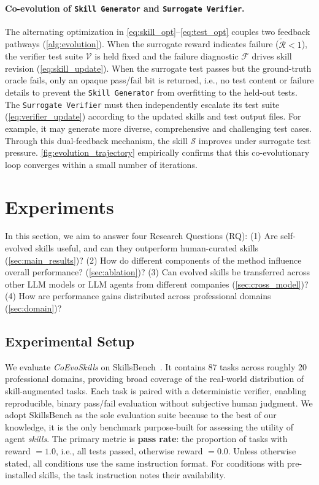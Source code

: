 \documentclass{article}
\newcommand{\method}{\textit{CoEvoSkills}\xspace}
\newcommand{\bench}{SkillsBench\xspace}
\newcommand{\skill}{\mathcal{S}}
\begin{document}
\paragraph{Co-evolution of \texttt{Skill Generator} and \texttt{Surrogate Verifier}.}
The alternating optimization in \autoref{eq:skill_opt}--\autoref{eq:test_opt} couples two feedback pathways (\autoref{alg:evolution}). When the surrogate reward indicates failure ($\tilde{\mathcal{R}} < 1$), the verifier test suite $\mathcal{V}$ is held fixed and the failure diagnostic $\mathcal{F}$ drives skill revision (\autoref{eq:skill_update}). When the surrogate test passes but the ground-truth oracle fails, only an opaque pass/fail bit is returned, i.e., no test content or failure details to prevent the \texttt{Skill Generator} from overfitting to the held-out tests. The \texttt{Surrogate Verifier} must then independently escalate its test suite (\autoref{eq:verifier_update}) according to the updated skills and test output files. For example, it may generate more diverse, comprehensive and challenging test cases. Through this dual-feedback mechanism, the skill $\skill$ improves under surrogate test pressure. \autoref{fig:evolution_trajectory} empirically confirms that this co-evolutionary loop converges within a small number of iterations.


\section{Experiments}
\label{sec:experiments}
In this section, we aim to answer four Research Questions (RQ): (1) Are self-evolved skills useful, and can they outperform human-curated skills (\autoref{sec:main_results})? (2) How do different components of the method influence overall performance? (\autoref{sec:ablation})? (3) Can evolved skills be transferred across other LLM models or LLM agents from different companies (\autoref{sec:cross_model})? (4) How are performance gains distributed across professional domains (\autoref{sec:domain})?

\subsection{Experimental Setup}
\label{sec:bench}
We evaluate \method on \bench~\citep{li2026skillsbench}. It contains 87 tasks across roughly 20 professional domains, providing broad coverage of the real-world distribution of skill-augmented tasks. Each task is paired with a deterministic verifier, enabling reproducible, binary pass/fail evaluation without subjective human judgment.
We adopt \bench as the sole evaluation suite because to the best of our knowledge, it is the only benchmark purpose-built for assessing the utility of agent \emph{skills}.
The primary metric is \textbf{pass rate}: the proportion of tasks with reward $=1.0$, i.e., all tests passed, otherwise reward $=0.0$. Unless otherwise stated, all conditions use the same instruction format. For conditions with pre-installed skills, the task instruction notes their availability.
\end{document}
